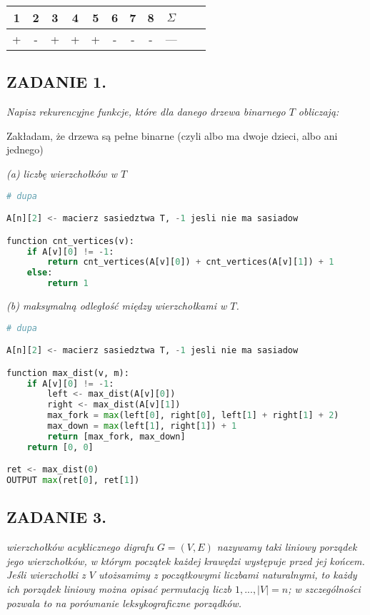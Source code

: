\documentclass{article}
\begin{document}
\begin{center}\begin{tabular}{| c | c | c | c | c | c | c | c | c | c | c |}
    \hline

    1 & 2 & 3 & 4 & 5 & 6 & 7 & 8 & $\Sigma$\\

    \hline

    + & - & + & + & + & - & - & - & ---\\

    \hline
\end{tabular}\end{center}

\subsection*{ZADANIE 1.}
\emph{\color{pink}Napisz rekurencyjne funkcje, które dla danego drzewa binarnego $T$ obliczają:}

Zakładam, że drzewa są pełne binarne (czyli albo ma dwoje dzieci, albo ani jednego)

\emph{\color{pink}(a) liczbę wierzchołków w $T$}

\begin{lstlisting}[language=Python]
# dupa

A[n][2] <- macierz sasiedztwa T, -1 jesli nie ma sasiadow

function cnt_vertices(v):
    if A[v][0] != -1:
        return cnt_vertices(A[v][0]) + cnt_vertices(A[v][1]) + 1
    else:
        return 1
\end{lstlisting}

\emph{\color{pink}(b) maksymalną odległość między wierzchołkami w $T$.}

\begin{lstlisting}[language=Python]
# dupa

A[n][2] <- macierz sasiedztwa T, -1 jesli nie ma sasiadow

function max_dist(v, m):
    if A[v][0] != -1:
        left <- max_dist(A[v][0])
        right <- max_dist(A[v][1])
        max_fork = max(left[0], right[0], left[1] + right[1] + 2)
        max_down = max(left[1], right[1]) + 1
        return [max_fork, max_down]
    return [0, 0]

ret <- max_dist(0)
OUTPUT max(ret[0], ret[1])
\end{lstlisting}

\subsection*{ZADANIE 3.}
 \emph{\color{pink}wierzchołków acyklicznego digrafu $G=(V, E)$ nazywamy taki liniowy porządek jego wierzchołków, w którym początek każdej krawędzi występuje przed jej końcem. Jeśli wierzchołki z $V$ utożsamimy z początkowymi liczbami naturalnymi, to każdy ich porządek liniowy można opisać permutacją liczb $1,...,|V|=n$; w szczególności pozwala to na porównanie leksykograficzne porządków.}
\end{document}
